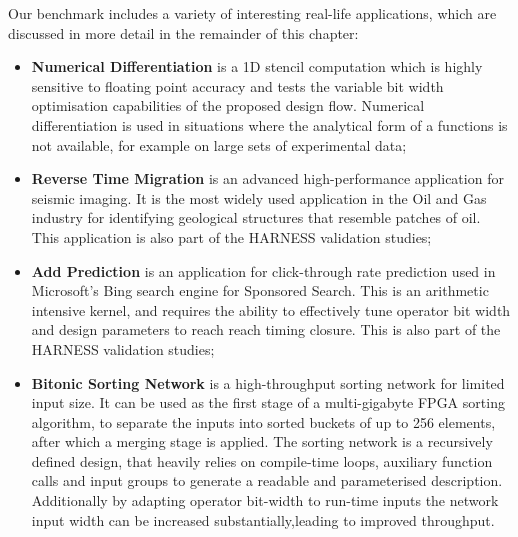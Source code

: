Our benchmark includes a variety of interesting real-life
applications, which are discussed in more detail in the remainder of
this chapter:
\begin{itemize}
\item \textbf{Numerical Differentiation} is a 1D stencil computation which
  is highly sensitive to floating point accuracy and tests the
  variable bit width optimisation capabilities of the proposed design
  flow. Numerical differentiation is used in situations where the
  analytical form of a functions is not available, for example on
  large sets of experimental data;
  \begin{comment}
  \item \textbf{Black Scholes Option Pricing} is a one dimensional
    stencil computation, with multiple time step iterations which
    requires the use of on-board DRAM to maximise efficiency; the Black
    Scholes model is one of the most commonly used models in finance for
    pricing derivatives of European options;
  \end{comment}
\item \textbf{Reverse Time Migration} is an advanced high-performance
  application for seismic imaging. It is the most widely used
  application in the Oil and Gas industry for identifying geological
  structures that resemble patches of oil. This application is also
  part of the HARNESS validation studies;
\item \textbf{Add Prediction} is an application for click-through rate
  prediction used in Microsoft's Bing search engine for Sponsored
  Search. This is an arithmetic intensive kernel, and requires the
  ability to effectively tune operator bit width and design parameters
  to reach reach timing closure. This is also part of the HARNESS
  validation studies;
\item \textbf{Bitonic Sorting Network} is a high-throughput sorting
  network for limited input size. It can be used as the first stage of
  a multi-gigabyte FPGA sorting algorithm, to separate the inputs into
  sorted buckets of up to 256 elements, after which a merging stage is
  applied. The sorting network is a recursively defined design, that
  heavily relies on compile-time loops, auxiliary function calls and
  input groups to generate a readable and parameterised
  description. Additionally by adapting operator bit-width to run-time
  inputs the network input width can be increased
  substantially,leading to improved throughput.
\end{itemize}


